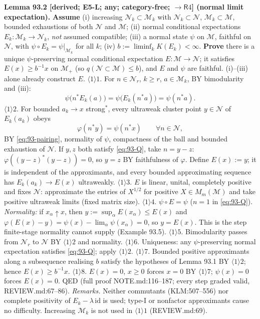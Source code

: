 \textbf{Lemma 93.2 [derived; E5-L; any; category-free; \(\to\mathsf R4\)] (normal limit expectation).}
\textbf{Assume}
(i) increasing \(\mathcal N_k\subset\mathcal M_k\) with \(\mathcal N_k\subset\mathcal N\), \(\mathcal M_k\subset\mathcal M\), bounded
exhaustions of both \(\mathcal N\) and \(\mathcal M\);
(ii) normal conditional expectations \(E_k:\mathcal M_k\to\mathcal N_k\), \emph{not} assumed compatible;
(iii) a normal state \(\psi\) on \(\mathcal M\), faithful on \(\mathcal N\), with \(\psi\circ E_k=\psi|_{\mathcal M_k}\) for all \(k\);
(iv) \(b:=\liminf_kK(E_k)<\infty\).
\textbf{Prove} there is a unique \(\psi\)-preserving normal conditional expectation \(E:\mathcal M\to\mathcal N\); it satisfies
\(E(x)\ge b^{-1}x\) on \(\mathcal M_+\) (so \(q(\mathcal N\subset\mathcal M)\le b\)), and \(E\) and \(\psi\) are faithful.  (i)--(iii)
alone already construct \(E\).
\(\langle1\rangle1\). For \(n\in\mathcal N_r\), \(k\ge r\), \(a\in\mathcal M_k\), BY bimodularity and (iii):
\begin{equation}\label{eq:93-pairing}
  \psi\big(n^*E_k(a)\big)=\psi\big(E_k(n^*a)\big)=\psi(n^*a).
\end{equation}
\(\langle1\rangle2\). For bounded \(a_k\to x\) strong\(^*\), every ultraweak cluster point \(y\in\mathcal N\) of \(E_k(a_k)\) obeys
\begin{equation}\label{eq:93-Q}
  \varphi(n^*y)=\psi(n^*x)\qquad\forall n\in\mathcal N,
\end{equation}
BY \eqref{eq:93-pairing}, normality of \(\psi\), compactness of the ball and bounded exhaustion of \(\mathcal N\).  If \(y,z\) both
satisfy \eqref{eq:93-Q}, take \(n=y-z\): \(\varphi((y-z)^*(y-z))=0\), so \(y=z\) BY faithfulness of \(\varphi\).  Define \(E(x):=y\);
it is independent of the approximants, and every bounded approximating sequence has \(E_k(a_k)\to E(x)\) ultraweakly.
\(\langle1\rangle3\). \(E\) is linear, unital, completely positive and fixes \(\mathcal N\): approximate the entries of
\(X^{1/2}\) for positive \(X\in M_m(\mathcal M)\) and take positive ultraweak limits (fixed matrix size).
\(\langle1\rangle4\). \(\psi\circ E=\psi\) (\(n=1\) in \eqref{eq:93-Q}).  \emph{Normality:} if \(x_\alpha\uparrow x\), then
\(y:=\sup_\alpha E(x_\alpha)\le E(x)\) and \(\varphi(E(x)-y)=\psi(x)-\lim_\alpha\psi(x_\alpha)=0\), so \(y=E(x)\).  This is the step
finite-stage normality cannot supply (Example 93.5).
\(\langle1\rangle5\). Bimodularity passes from \(\mathcal N_r\) to \(\mathcal N\) BY \(\langle1\rangle2\) and normality.
\(\langle1\rangle6\). Uniqueness: any \(\psi\)-preserving normal expectation satisfies \eqref{eq:93-Q}; apply \(\langle1\rangle2\).
\(\langle1\rangle7\). Bounded positive approximants along a subsequence realising \(b\) satisfy the hypotheses of Lemma 93.1
BY \(\langle1\rangle2\); hence \(E(x)\ge b^{-1}x\).
\(\langle1\rangle8\). \(E(x)=0\), \(x\ge0\) forces \(x=0\) BY \(\langle1\rangle7\); \(\psi(x)=0\) forces \(E(x)=0\).  QED
(full proof NOTE.md:116--187; every step graded valid, REVIEW.md:67--86).
\emph{Remarks.}  Neither commutants (KLM:507--556) nor complete positivity of \(E_k-\lambda\,\mathrm{id}\) is used;
type-I or nonfactor approximants cause no difficulty.  Increasing \(\mathcal M_k\) is not used in \(\langle1\rangle1\)
(REVIEW.md:69).

